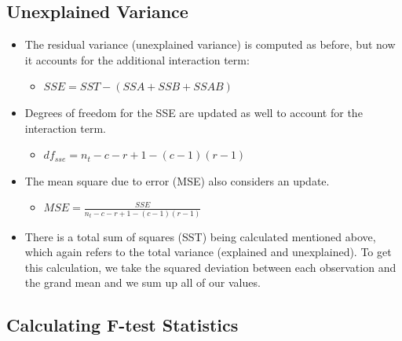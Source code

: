 \documentclass[
  letterpaper,
  DIV=11,
  numbers=noendperiod]{scrreprt}
\providecommand{\tightlist}{%
  \setlength{\itemsep}{0pt}\setlength{\parskip}{0pt}}\usepackage{longtable,booktabs,array}
\begin{document}
\subsection{Unexplained Variance}\label{unexplained-variance-2}

\begin{itemize}
\item
  The residual variance (unexplained variance) is computed as before,
  but now it accounts for the additional interaction term:

  \begin{itemize}
  \tightlist
  \item
    \(SSE = SST - (SSA + SSB + SSAB)\)
  \end{itemize}
\item
  Degrees of freedom for the SSE are updated as well to account for the
  interaction term.

  \begin{itemize}
  \tightlist
  \item
    \(df_{sse} = n_t - c - r + 1 - (c-1)(r-1)\)
  \end{itemize}
\item
  The mean square due to error (MSE) also considers an update.

  \begin{itemize}
  \tightlist
  \item
    \(MSE = \frac{SSE}{n_t - c - r + 1 - (c-1)(r-1)}\)
  \end{itemize}
\item
  There is a total sum of squares (SST) being calculated mentioned
  above, which again refers to the total variance (explained and
  unexplained). To get this calculation, we take the squared deviation
  between each observation and the grand mean and we sum up all of our
  values.
\end{itemize}

\subsection{Calculating F-test
Statistics}\label{calculating-f-test-statistics-1}
\end{document}
